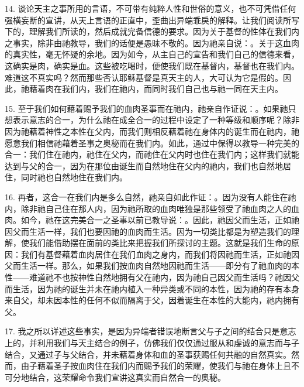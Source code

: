 14. 谈论天主之事所用的言语，不可带有纯粹人性和世俗的意义，也不可凭借任何强横妄断的宣讲，从天上言语的正直中，歪曲出异端乖戾的解释。让我们阅读所写下的，理解我们所读的，然后成就完备信德的要求。因为关于基督的性体在我们内之事实，除非由祂教导，我们的话便是愚昧不敬的。因为祂亲自说：。关于这血肉的真实性，毫无怀疑的余地。因为如今，从主自己的宣告和我们自己的信德来看，这确实是肉，确实是血。这些被吃喝时，便使我们既在基督内，基督也在我们内。难道这不真实吗？然而那些否认耶稣基督是真天主的人，大可认为它是假的。因此，祂藉着肉在我们内，我们在祂内，而同时我们自己也与祂一同在天主内。\par

15. 至于我们如何藉着赐予我们的血肉圣事而在祂内，祂亲自作证说：。如果祂只想表示意志的合一，为什么祂在成全合一的过程中设定了一种等级和顺序呢？除非因为祂藉着神性之本性在父内，而我们则相反藉着祂在身体内的诞生而在祂内，祂愿意我们相信祂藉着圣事之奥秘而在我们内。如此，通过中保得以教导一种完美的合一：我们住在祂内，祂住在父内，而祂住在父内时也住在我们内；这样我们就能达到与父的合一，因为在那位由诞生而自然地住在父内的祂内，我们也自然地居住，同时祂也自然地住在我们内。\par

16. 再者，这合一在我们内是多么自然，祂亲自如此作证：。因为没有人能住在祂内，除非祂自己住在那人内，因为祂所取的血肉唯独是那些领受了祂血肉之人的血肉。如今，祂在这完美合一之圣事以前已教导说：。因此，祂因父而生活，正如祂因父而生活一样，我们也要因祂的血肉而生活。因为一切类比都是为塑造我们的理解，使我们能借助摆在面前的类比来把握我们所探讨的主题。这就是我们生命的原因：我们有基督藉着血肉居住在我们血肉之身内，而我们将因祂而生活，正如祂因父而生活一样。那么，如果我们按血肉自然地因祂而生活——即分有了祂血肉的本性——难道祂不也按神性自然地拥有父在祂内，因为祂自己因父而生活吗？祂因父而生活，因为祂的诞生并未在祂内植入一种异类或不同的本性，因为祂的存有本身来自父，却未因本性的任何不似而隔离于父，因着诞生在本性的大能内，祂内拥有父。\par

17. 我之所以详述这些事实，是因为异端者错误地断言父与子之间的结合只是意志上的，并利用我们与天主结合的例子，仿佛我们仅仅通过服从和虔诚的意志而与子结合，又通过子与父结合，并未藉着身体和血的圣事获赐任何共融的自然真实。然而，由子藉着圣子按血肉住在我们内而赐予我们的荣耀，使我们与祂在身体上且不可分地结合，这荣耀命令我们宣讲这真实而自然合一的奥秘。\par

